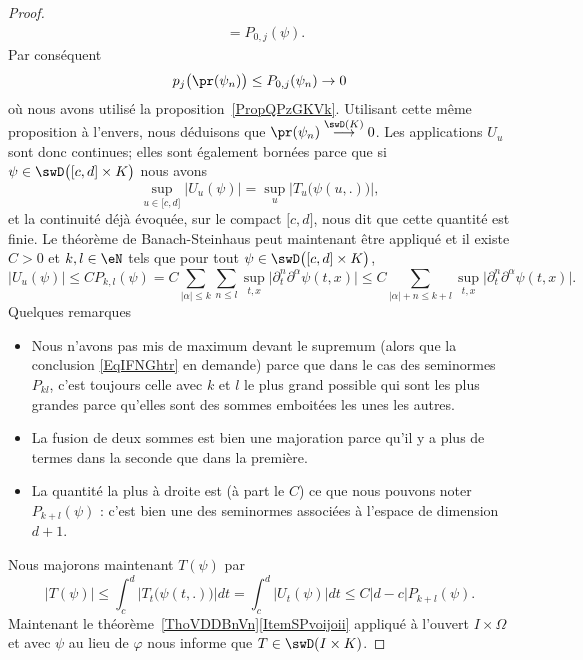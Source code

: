 \begin{proof}
\begin{subequations}
\begin{align}
			                         & =P_{0,j}(\psi).
		\end{align}
	\end{subequations}
	Par conséquent
	\begin{equation}
		p_j\big( \pr(\psi_n) \big)\leq P_{0,j}(\psi_n)\to 0
	\end{equation}
	où nous avons utilisé la proposition~\ref{PropQPzGKVk}. Utilisant cette même proposition à l'envers, nous déduisons que \( \pr(\psi_n)\stackrel{\swD(K)}{\longrightarrow}0\). Les applications \( U_u\) sont donc continues; elles sont également bornées parce que si \( \psi\in\swD\big( \mathopen[ c , d \mathclose]\times K \big) \) nous avons
	\begin{equation}
		\sup_{u \in\mathopen[ c , d \mathclose]}\big| U_u(\psi) \big|=\sup_u \big| T_u\big( \psi(u,.) \big) \big|,
	\end{equation}
	et la continuité déjà évoquée, sur le compact \( \mathopen[ c , d \mathclose]\), nous dit que cette quantité est finie. Le théorème de Banach-Steinhaus peut maintenant être appliqué et il existe \( C>0\) et \( k,l\in \eN\) tels que pour tout \( \psi\in\swD\big( \mathopen[ c , d \mathclose]\times K \big)\),
	\begin{equation}
		\big| U_u(\psi) \big|\leq C P_{k,l}(\psi)=C\sum_{| \alpha |\leq k}\sum_{n\leq l}\sup_{t,x}\big| \partial_t^n\partial^{\alpha}\psi(t,x) \big|\leq C\sum_{| \alpha |+n\leq k+l}\sup_{t,x}\big| \partial_t^n\partial^{\alpha}\psi(t,x) \big|.
	\end{equation}
	Quelques remarques
	\begin{itemize}
		\item Nous n'avons pas mis de maximum devant le supremum (alors que la conclusion \eqref{EqIFNGhtr} en demande) parce que dans le cas des seminormes \( P_{kl}\), c'est toujours celle avec \( k\) et \( l\) le plus grand possible qui sont les plus grandes parce qu'elles sont des sommes emboitées les unes les autres.
		\item La fusion de deux sommes est bien une majoration parce qu'il y a plus de termes dans la seconde que dans la première.
		\item La quantité la plus à droite est (à part le \( C\)) ce que nous pouvons noter \( P_{k+l}(\psi)\) : c'est bien une des seminormes associées à l'espace de dimension \( d+1\).
	\end{itemize}
	Nous majorons maintenant \( T(\psi)\) par
	\begin{equation}
		\big| T(\psi) \big|\leq \int_c^d\big| T_t\big( \psi(t,.) \big) \big|dt
		=\int_c^d\big|   U_t(\psi) \big|dt
		\leq C| d-c |P_{k+l}(\psi).
	\end{equation}
	Maintenant le théorème~\ref{ThoVDDBnVn}\ref{ItemSPvoijoii} appliqué à l'ouvert \( I\times \Omega\) et avec \( \psi\) au lieu de \( \varphi\) nous informe que \( T\in\swD(I\times K)\).
\end{proof}

